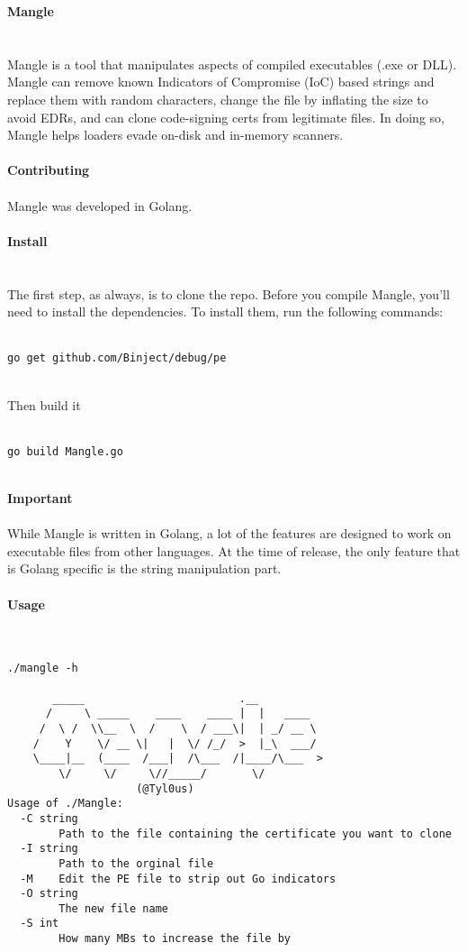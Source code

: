 \documentclass{article}
\begin{document}
{\noindent \Huge \textbf{Mangle}}\\\\
\\
Mangle is a tool that manipulates aspects of compiled executables (.exe or DLL). Mangle can remove known Indicators of Compromise (IoC) based strings and replace them with random characters, change the file by inflating the size to avoid EDRs, and can clone code-signing certs from legitimate files. In doing so, Mangle helps loaders evade on-disk and in-memory scanners.\\
\\
{\noindent \LARGE \textbf{Contributing}}\\\\
Mangle was developed in Golang.\\
\\
{\noindent \LARGE \textbf{Install}}\\\\
\\
The first step, as always, is to clone the repo. Before you compile Mangle, you'll need to install the dependencies. To install them, run the following commands:\\
\\
\begin{lstlisting}
go get github.com/Binject/debug/pe
\end{lstlisting}
\\
Then build it\\
\\
\begin{lstlisting}
go build Mangle.go
\end{lstlisting}
\\
{\noindent \LARGE \textbf{Important }}\\\\
While Mangle is written in Golang, a lot of the features are designed to work on executable files from other languages. At the time of release, the only feature that is Golang specific is the string manipulation part.\\
\\
{\noindent \LARGE \textbf{Usage}}\\\\
\\
\begin{lstlisting}
./mangle -h

	   _____                        .__
	  /     \ _____    ____    ____ |  |   ____
	 /  \ /  \\__  \  /    \  / ___\|  | _/ __ \
	/    Y    \/ __ \|   |  \/ /_/  >  |_\  ___/
	\____|__  (____  /___|  /\___  /|____/\___  >
		\/     \/     \//_____/   	  \/
					(@Tyl0us)
Usage of ./Mangle:
  -C string
        Path to the file containing the certificate you want to clone
  -I string
        Path to the orginal file
  -M    Edit the PE file to strip out Go indicators
  -O string
        The new file name
  -S int
        How many MBs to increase the file by

\end{lstlisting}
\end{document}
